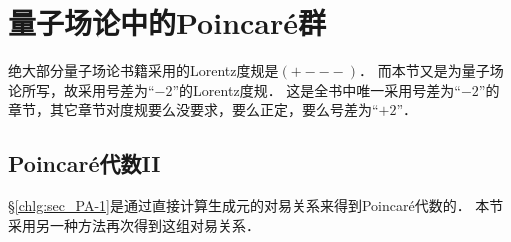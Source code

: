 \section{量子场论中的Poincar\'{e}群}\label{chlar:sec_poincare}

绝大部分量子场论书籍采用的Lorentz度规是$(+---)$．
而本节又是为量子场论所写，故采用号差为“$-2$”的Lorentz度规．
这是全书中唯一采用号差为“$-2$”的章节，其它章节对度规要么没要求，要么正定，要么号差为“$+2$”．

\subsection{Poincar\'{e}代数II}\label{chlar:sec_PA-2}
\S\ref{chlg:sec_PA-1}是通过直接计算生成元的对易关系来得到Poincar\'{e}代数的．
本节采用另一种方法\cite[\S 10.2]{tung-1985}\cite[\S 2.4]{weinberg_vol1}再次得到这组对易关系．



